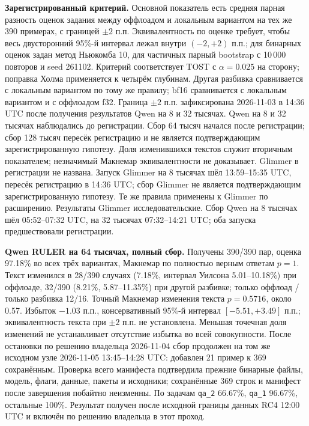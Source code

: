 \textbf{Зарегистрированный критерий.} Основной показатель есть средняя парная разность оценок задания
между оффлоадом и локальным вариантом на тех же 390 примерах, с границей $\pm2$ п.п.
Эквивалентность по оценке требует, чтобы весь двусторонний 95\%-й интервал лежал внутри $(-2,+2)$ п.п.;
для бинарных оценок задан метод Ньюкомба 10, для частичных парный bootstrap с 10\,000 повторов и seed 261102.
Критерий соответствует TOST с $\alpha=0.025$ на сторону; поправка Холма применяется к четырём глубинам.
Другая разбивка сравнивается с локальным вариантом по тому же правилу; bf16 сравнивается с локальным вариантом и с оффлоадом f32.
Граница $\pm2$ п.п. зафиксирована 2026-11-03 в 14:36 UTC после получения результатов Qwen на 8 и 32 тысячах.
Qwen на 8 и 32 тысячах наблюдались до регистрации. Сбор 64 тысяч начался после регистрации;
сбор 128 тысяч пересёк регистрацию и не является подтверждающим зарегистрированную гипотезу.
Доля изменившихся текстов служит вторичным показателем; незначимый Макнемар эквивалентности не доказывает.
Glimmer в регистрации не названа. Запуск Glimmer на 8 тысячах шёл 13:59--15:35 UTC,
пересёк регистрацию в 14:36 UTC; сбор Glimmer не является подтверждающим зарегистрированную гипотезу.
Те же правила применены к Glimmer по расширению. Результаты Glimmer исследовательские.
Сбор Qwen на 8 тысячах шёл 05:52--07:32 UTC, на 32 тысячах 07:32--14:21 UTC;
оба запуска предшествовали регистрации.

\textbf{Qwen RULER на 64 тысячах, полный сбор.} Получены 390/390 пар,
оценка 97.18\% во всех трёх вариантах, Макнемар по полностью верным ответам $p=1$.
Текст изменился в 28/390 случаях (7.18\%, интервал Уилсона 5.01--10.18\%) при оффлоаде,
32/390 (8.21\%, 5.87--11.35\%) при другой разбивке; только оффлоад / только разбивка 12/16.
Точный Макнемар изменения текста $p=0.5716$, около 0.57. Избыток $-1.03$ п.п.,
консервативный 95\%-й интервал $[-5.51,+3.49]$ п.п.; эквивалентность текста при $\pm2$ п.п. не установлена.
Меньшая точечная доля изменений не устанавливает отсутствие избытка во всей совокупности.
После остановки по решению владельца 2026-11-04 сбор продолжен на том же исходном узле
2026-11-05 13:45--14:28 UTC: добавлен 21 пример к 369 сохранённым.
Проверка всего манифеста подтвердила прежние бинарные файлы, модель, флаги, данные, пакеты и исходники;
сохранённые 369 строк и манифест после завершения побайтно неизменны.
По задачам \texttt{qa\_2} 66.67\%, \texttt{qa\_1} 96.67\%, остальные 100\%.
Результат получен после исходной границы данных RC4 12:00 UTC и включён по решению владельца в этот проход.

